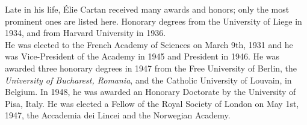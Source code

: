 \documentclass[12pt]{article}
\theoremstyle{plain}
\theoremstyle{definition}
\numberwithin{equation}{section}
\begin{document}
 Late in his life, \'Elie Cartan received many awards and honors; only the most prominent ones are listed here.
Honorary degrees from the University of Liege in 1934, and from Harvard University in 1936. \\ 
He was elected to the French Academy of Sciences on March 9th, 1931 and he was Vice-President of the Academy in 1945 and President in 1946. He was awarded three honorary degrees in 1947 from the Free University of Berlin, the {\em University of Bucharest, Romania}, and the Catholic University of Louvain, in Belgium. In 1948, he was awarded an Honorary Doctorate by the University of Pisa, Italy. He was elected a Fellow of the Royal Society of London on May 1st, 1947, the Accademia dei Lincei and the Norwegian Academy.


\end{document}
